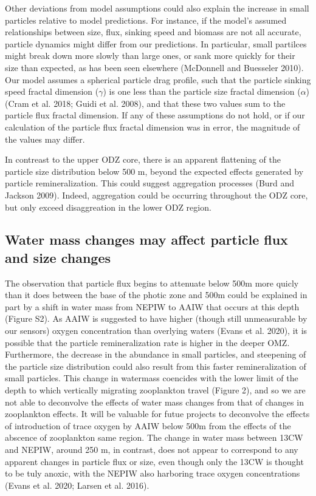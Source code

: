 \documentclass[]{article}
\begin{document}
Other deviations from model assumptions could also explain the increase
in small particles relative to model predictions. For instance, if the
model's assumed relationships between size, flux, sinking speed and
biomass are not all accurate, particle dynamics might differ from our
predictions. In particular, small partilces might break down more slowly
than large ones, or sank more quickly for their size than expected, as
has been seen elsewhere (McDonnell and Buesseler 2010). Our model
assumes a spherical particle drag profile, such that the particle
sinking speed fractal dimension (\(\gamma\)) is one less than the
particle size fractal dimension (\(\alpha\)) (Cram et al. 2018; Guidi et
al. 2008), and that these two values sum to the particle flux fractal
dimension. If any of these assumptions do not hold, or if our
calculation of the particle flux fractal dimension was in error, the
magnitude of the values may differ.

In contreast to the upper ODZ core, there is an apparent flattening of
the particle size distribution below 500 m, beyond the expected effects
generated by particle remineralization. This could suggest aggregation
processes (Burd and Jackson 2009). Indeed, aggregation could be
occurring throughout the ODZ core, but only exceed disaggreation in the
lower ODZ region.

\hypertarget{water-mass-changes-may-affect-particle-flux-and-size-changes}{%
\subsection{Water mass changes may affect particle flux and size
changes}\label{water-mass-changes-may-affect-particle-flux-and-size-changes}}

The observation that particle flux begins to attenuate below 500m more
quicly than it does between the base of the photic zone and 500m could
be explained in part by a shift in water mass from NEPIW to AAIW that
occurs at this depth (Figure S2). As AAIW is suggested to have higher
(though still unmeasurable by our sensors) oxygen concentration than
overlying waters (Evans et al. 2020), it is possible that the particle
remineralization rate is higher in the deeper OMZ. Furthermore, the
decrease in the abundance in small particles, and steepening of the
particle size distribution could also result from this faster
remineralization of small particles. This change in watermass coencides
with the lower limit of the depth to which vertically migrating
zooplankton travel (Figure 2), and so we are not able to deconvolve the
effects of water mass changes from that of changes in zooplankton
effects. It will be valuable for futue projects to deconvolve the
effects of introduction of trace oxygen by AAIW below 500m from the
effects of the abscence of zooplankton same region. The change in water
mass between 13CW and NEPIW, around 250 m, in contrast, does not appear
to correspond to any apparent changes in particle flux or size, even
though only the 13CW is thought to be tuly anoxic, with the NEPIW also
harboring trace oxygen concentrations (Evans et al. 2020; Larsen et al.
2016).
\end{document}
